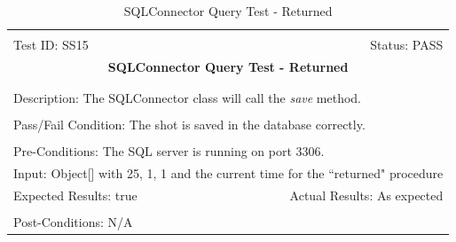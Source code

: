 \documentclass[11pt]{article}
\begin{document}
\begin{center}
\begin{table}[H]
\begin{tabular}{|l r|}\hline&\\[-2mm]
	Test ID: SS15	&Status: PASS\\[-3mm]
	\multicolumn{2}{|c|}{\textbf{\large{SQLConnector Query Test - Returned}}}\\&\\\hline&\\[-3mm]
	\multicolumn{2}{|p{\textwidth}|}{Description: The SQLConnector class will call the \textit{save} method.}\\[1mm]\hline&\\[-3mm]
	\multicolumn{2}{|p{\textwidth}|}{Pass/Fail Condition: The shot is saved in the database correctly.}\\[1mm]\hline&\\[-3mm]
	\multicolumn{2}{|p{\textwidth}|}{Pre-Conditions: The SQL server is running on port 3306.}\\[4mm]
	\multicolumn{2}{|p{\textwidth}|}{Input: Object[] with 25, 1, 1 and the current time for the ``returned" procedure}\\[2mm]\hline
	\multicolumn{1}{|p{0.49\textwidth}}{Expected Results: true}	&\multicolumn{1}{|p{0.45\textwidth}|}{Actual Results: As expected}\\\hline&\\[-3mm]
	\multicolumn{2}{|p{\textwidth}|}{Post-Conditions: N/A}\\\hline
\end{tabular}
\caption{SQLConnector Query Test - Returned}
\end{table}
\end{center}
\end{document}
